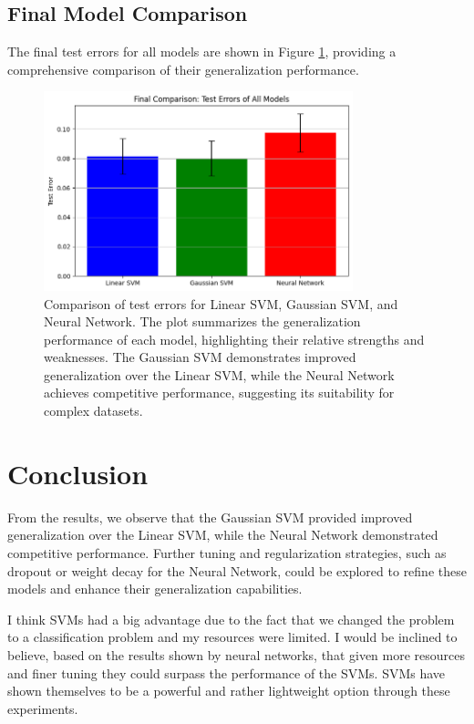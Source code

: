\documentclass{article}
\begin{document}
\subsection{Final Model Comparison}
The final test errors for all models are shown in Figure \ref{fig:final_comparison}, providing a comprehensive comparison of their generalization performance.

\begin{figure}[H]
    \centering
    \includegraphics[width=0.8\textwidth]{test_error_comparison.png}
    \caption{Comparison of test errors for Linear SVM, Gaussian SVM, and Neural Network. The plot summarizes the generalization performance of each model, highlighting their relative strengths and weaknesses. The Gaussian SVM demonstrates improved generalization over the Linear SVM, while the Neural Network achieves competitive performance, suggesting its suitability for complex datasets.}
    \label{fig:final_comparison}
\end{figure}

\section{Conclusion}
From the results, we observe that the Gaussian SVM provided improved generalization over the Linear SVM, while the Neural Network demonstrated competitive performance. Further tuning and regularization strategies, such as dropout or weight decay for the Neural Network, could be explored to refine these models and enhance their generalization capabilities.

I think SVMs had a big advantage due to the fact that we changed the problem to a classification problem and my resources were limited. I would be inclined to believe, based on the results shown by neural networks, that given more resources and finer tuning they could surpass the performance of the SVMs. SVMs have shown themselves to be a powerful and rather lightweight option through these experiments.
\end{document}
